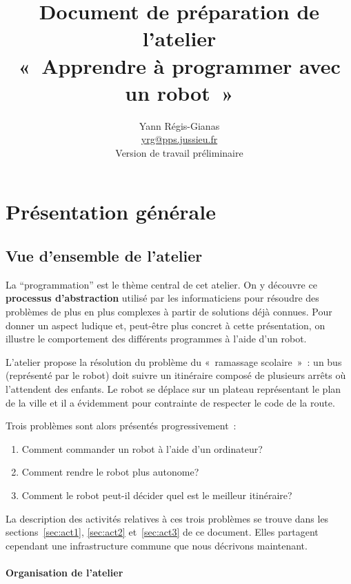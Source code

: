 \documentclass[11pt,a4paper]{article}
\title{Document de préparation de l'atelier \\ 
  «~Apprendre à programmer avec un robot~»}
\author{Yann Régis-Gianas \\ \url{yrg@pps.jussieu.fr} \\
{\small Version de travail préliminaire}}
\begin{document}
\maketitle

\tableofcontents

\section{Présentation générale}

\subsection{Vue d'ensemble de l'atelier}

La ``programmation'' est le thème central de cet atelier. On y
découvre ce \textbf{processus d'abstraction} utilisé par les
informaticiens pour résoudre des problèmes de plus en plus complexes à
partir de solutions déjà connues. Pour donner un aspect ludique et, peut-être
plus concret à cette présentation, on illustre le comportement des différents
programmes à l'aide d'un robot. 

L'atelier propose la résolution du problème du «~ramassage
  scolaire~»~: un bus (représenté par le robot) doit suivre un
itinéraire composé de plusieurs arrêts où l'attendent des enfants. Le
robot se déplace sur un plateau représentant le plan de la ville et il
a évidemment pour contrainte de respecter le code de la route.

Trois problèmes sont alors présentés progressivement~: 

\begin{enumerate}
\item Comment commander un robot à l'aide d'un ordinateur? 
\item Comment rendre le robot plus autonome?
\item Comment le robot peut-il décider quel est le meilleur itinéraire?
\end{enumerate}

La description des activités relatives à ces trois problèmes se trouve
dans les sections~\ref{sec:act1}, \ref{sec:act2} et~\ref{sec:act3} de
ce document. Elles partagent cependant une infrastructure commune que
nous décrivons maintenant. 

\paragraph{Organisation de l'atelier}
\end{document}

